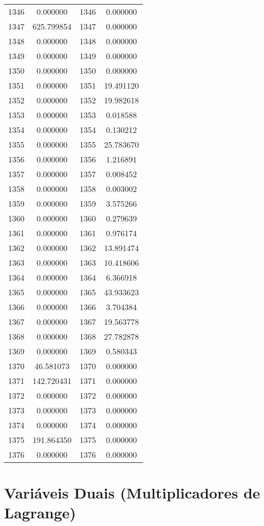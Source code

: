 \documentclass[12pt]{article}
\begin{document}
\begin{longtable}{@{}cccc@{}}
1346 & 0.000000 & 1346 & 0.000000 \\
1347 & 625.799854 & 1347 & 0.000000 \\
1348 & 0.000000 & 1348 & 0.000000 \\
1349 & 0.000000 & 1349 & 0.000000 \\
1350 & 0.000000 & 1350 & 0.000000 \\
1351 & 0.000000 & 1351 & 19.491120 \\
1352 & 0.000000 & 1352 & 19.982618 \\
1353 & 0.000000 & 1353 & 0.018588 \\
1354 & 0.000000 & 1354 & 0.130212 \\
1355 & 0.000000 & 1355 & 25.783670 \\
1356 & 0.000000 & 1356 & 1.216891 \\
1357 & 0.000000 & 1357 & 0.008452 \\
1358 & 0.000000 & 1358 & 0.003002 \\
1359 & 0.000000 & 1359 & 3.575266 \\
1360 & 0.000000 & 1360 & 0.279639 \\
1361 & 0.000000 & 1361 & 0.976174 \\
1362 & 0.000000 & 1362 & 13.891474 \\
1363 & 0.000000 & 1363 & 10.418606 \\
1364 & 0.000000 & 1364 & 6.366918 \\
1365 & 0.000000 & 1365 & 43.933623 \\
1366 & 0.000000 & 1366 & 3.704384 \\
1367 & 0.000000 & 1367 & 19.563778 \\
1368 & 0.000000 & 1368 & 27.782878 \\
1369 & 0.000000 & 1369 & 0.580343 \\
1370 & 46.581073 & 1370 & 0.000000 \\
1371 & 142.720431 & 1371 & 0.000000 \\
1372 & 0.000000 & 1372 & 0.000000 \\
1373 & 0.000000 & 1373 & 0.000000 \\
1374 & 0.000000 & 1374 & 0.000000 \\
1375 & 191.864350 & 1375 & 0.000000 \\
1376 & 0.000000 & 1376 & 0.000000 \\

\end{longtable}

\section{Variáveis Duais (Multiplicadores de Lagrange)}
\end{document}
